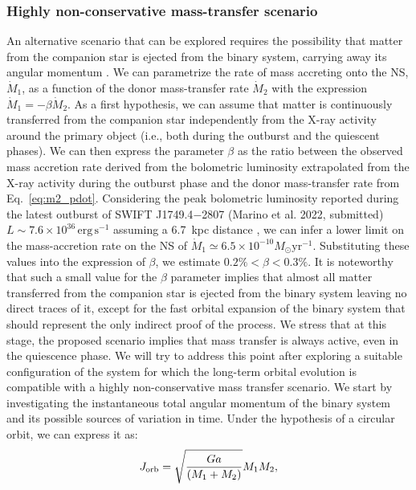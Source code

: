 \documentclass[fleqn,usenatbib]{mnras}
\newcommand{\swiftj}{SWIFT J1749.4$-$2807}
\begin{document}
\subsubsection*{Highly non-conservative mass-transfer scenario}
An alternative scenario that can be explored requires the possibility that matter from the companion star is ejected from the binary system, carrying away its angular momentum \citep[see e.g.,][for more details]{di-Salvo:2008uu,Burderi:2009td}. We can parametrize the rate of mass accreting onto the NS, $\dot{M}_1$, as a function of the donor mass-transfer rate $\dot{M}_2$ with the expression $\dot{M}_1=-\beta \dot{M}_2$. As a first hypothesis, we can assume that matter is continuously transferred from the companion star independently from the X-ray activity around the primary object (i.e., both during the outburst and the quiescent phases). We can then express the parameter $\beta$ as the ratio between the observed mass accretion rate derived from the bolometric luminosity extrapolated from the X-ray activity during the outburst phase and the donor mass-transfer rate from Eq.~\ref{eq:m2_pdot}. Considering the peak bolometric luminosity reported during the latest outburst of \swiftj{} (Marino et al. 2022, submitted) $L\sim7.6\times 10^{36}\,\text{erg}\,\text{s}^{-1}$ assuming a 6.7~kpc distance \citep{Wijnands:2009wa}, we can infer a lower limit on the mass-accretion rate on the NS of $\dot{M}_1\simeq6.5\times 10^{-10}{M}_{\odot} \text{yr}^{-1}$. Substituting these values into the expression of $\beta$, we estimate $0.2\%<\beta<0.3\%$. It is noteworthy that such a small value for the $\beta$ parameter implies that almost all matter transferred from the companion star is ejected from the binary system leaving no direct traces of it, except for the fast orbital expansion of the binary system that should represent the only indirect proof of the process. We stress that at this stage, the proposed scenario implies that mass transfer is always active, even in the quiescence phase. We will try to address this point after exploring a suitable configuration of the system  for which the long-term orbital evolution is compatible with a highly non-conservative mass transfer scenario. 
We start by investigating the instantaneous total angular momentum of the binary system and its possible sources of variation in time. Under the hypothesis of a circular orbit, we can express it as:
\begin{equation}
\label{eq:binarymoment}
J_{\rm orb}=\sqrt{\frac{Ga}{(M_1+M_2)}}M_1M_2,
\end{equation}
\end{document}
